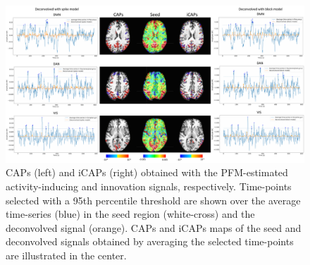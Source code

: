 \begin{figure}[t!]
    \begin{center}
        \includegraphics[width=\textwidth]{figures/caps.pdf}
    \end{center}
    \caption{CAPs (left) and iCAPs (right) obtained with the PFM-estimated activity-inducing and innovation signals, respectively. Time-points selected with a 95th percentile threshold are shown over the average time-series (blue) in the seed region (white-cross) and the deconvolved signal (orange). CAPs and iCAPs maps of the seed and deconvolved signals obtained by averaging the selected time-points are illustrated in the center.}
\label{fig:caps}
\end{figure}